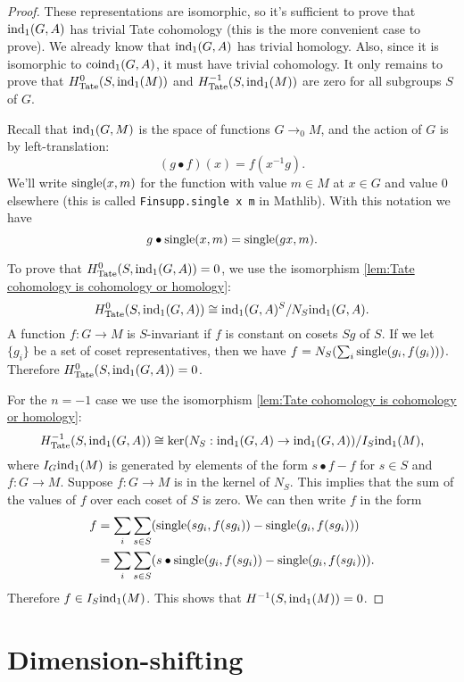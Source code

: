 \begin{proof}
	These representations are isomorphic, so it's
	sufficient to prove that $\mathrm{ind}_1(G,A)$ has trivial Tate cohomology
	(this is the more convenient case to prove).
	We already know that $\mathrm{ind}_1(G,A)$ has trivial homology.
	Also, since it is isomorphic to $\mathrm{coind}_1(G,A)$, it must have trivial cohomology.
	It only remains to prove that $H^0_{\mathrm{Tate}}(S,\mathrm{ind}_1(M))$
	and $H^{-1}_{\mathrm{Tate}}(S,\mathrm{ind}_1(M))$ are zero	for all subgroups $S$ of $G$.

	Recall that $\mathrm{ind}_1(G,M)$ is the space of functions $G \to_0 M$, and the action of $G$ is by
	left-translation:
	\[
		(g \bullet f) (x) = f (x^{-1}g).
	\]
	We'll write $\mathrm{single}(x,m)$ for the function with value $m\in M$ at $x \in G$ and value $0$
	elsewhere (this is called \texttt{Finsupp.single x m} in Mathlib).
	With this notation we have
	\[
		g \bullet \mathrm{single}(x,m) = \mathrm{single}(gx,m).
	\]

	To prove that $H^0_{\mathrm{Tate}}(S,\mathrm{ind}_1(G,A))=0$, we use the isomorphism
	\ref{lem:Tate cohomology is cohomology or homology}:
	\[
		H^0_{\mathrm{Tate}}(S,\mathrm{ind}_1(G,A)) \cong \mathrm{ind}_1(G,A)^S / N_S \mathrm{ind}_1(G,A).
	\]
	A function $f : G \to M$ is $S$-invariant if $f$ is constant on cosets $Sg$ of $S$.
	If we let $\{g_i\}$ be a set of coset representatives,
	then we have $f = N_S (\sum_i \mathrm{single}(g_i, f(g_i)))$.
	Therefore $H^0_{\mathrm{Tate}}(S,\mathrm{ind}_1(G,A))=0$.

	For the $n=-1$ case we use the isomorphism \ref{lem:Tate cohomology is cohomology or homology}:
	\[
		H^{-1}_{\mathrm{Tate}}(S,\mathrm{ind}_1(G,A))
		\cong
		\ker(N_S : \mathrm{ind}_1(G,A) \to \mathrm{ind}_1(G,A)) / I_S \mathrm{ind}_1(M),
	\]
	where $I_G \mathrm{ind}_1(M)$ is generated by elements of the form $s \bullet f - f$ for $s \in S$
	and $f : G \to M$.
	Suppose $f:G \to M$ is in the kernel of $N_S$.
	This implies that the sum of the values of $f$ over each coset of $S$ is zero.
	We can then write $f$ in the form
	\begin{align*}
		f
		& = \sum_i \sum_{s \in S} (\mathrm{single}(sg_i, f(sg_i)) - \mathrm{single}(g_i,f(sg_i)))\\
		& = \sum_i \sum_{s \in S} (s \bullet \mathrm{single}(g_i, f(sg_i)) - \mathrm{single}(g_i,f(sg_i))).
	\end{align*}
	Therefore $f \in I_S \mathrm{ind}_1(M)$. This shows that $H^{-1}(S,\mathrm{ind}_1(M)) = 0$.
\end{proof}





\section{Dimension-shifting}

